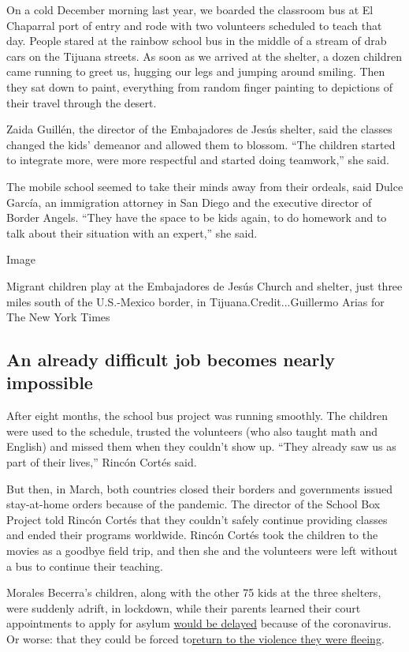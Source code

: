 On a cold December morning last year, we boarded the classroom bus at El
Chaparral port of entry and rode with two volunteers scheduled to teach
that day. People stared at the rainbow school bus in the middle of a
stream of drab cars on the Tijuana streets. As soon as we arrived at the
shelter, a dozen children came running to greet us, hugging our legs and
jumping around smiling. Then they sat down to paint, everything from
random finger painting to depictions of their travel through the desert.

Zaida Guillén, the director of the Embajadores de Jesús shelter, said
the classes changed the kids' demeanor and allowed them to blossom.
``The children started to integrate more, were more respectful and
started doing teamwork,'' she said.

The mobile school seemed to take their minds away from their ordeals,
said Dulce García, an immigration attorney in San Diego and the
executive director of Border Angels. ``They have the space to be kids
again, to do homework and to talk about their situation with an
expert,'' she said.

Image

Migrant children play at the Embajadores de Jesús Church and shelter,
just three miles south of the U.S.-Mexico border, in
Tijuana.Credit...Guillermo Arias for The New York Times

\hypertarget{an-already-difficult-job-becomes-nearly-impossible}{%
\subsection{An already difficult job becomes nearly
impossible}\label{an-already-difficult-job-becomes-nearly-impossible}}

After eight months, the school bus project was running smoothly. The
children were used to the schedule, trusted the volunteers (who also
taught math and English) and missed them when they couldn't show up.
``They already saw us as part of their lives,'' Rincón Cortés said.

But then, in March, both countries closed their borders and governments
issued stay-at-home orders because of the pandemic. The director of the
School Box Project told Rincón Cortés that they couldn't safely continue
providing classes and ended their programs worldwide. Rincón Cortés took
the children to the movies as a goodbye field trip, and then she and the
volunteers were left without a bus to continue their teaching.

Morales Becerra's children, along with the other 75 kids at the three
shelters, were suddenly adrift, in lockdown, while their parents learned
their court appointments to apply for asylum
\href{https://www.nytimes3xbfgragh.onion/2020/03/17/us/politics/trump-coronavirus-mexican-border.html}{would
be delayed} because of the coronavirus. Or worse: that they could be
forced
to\href{https://www.nytimes3xbfgragh.onion/2020/03/17/world/americas/immigration-guatemala-us-asylum.html}{return
to the violence they were fleeing}.

